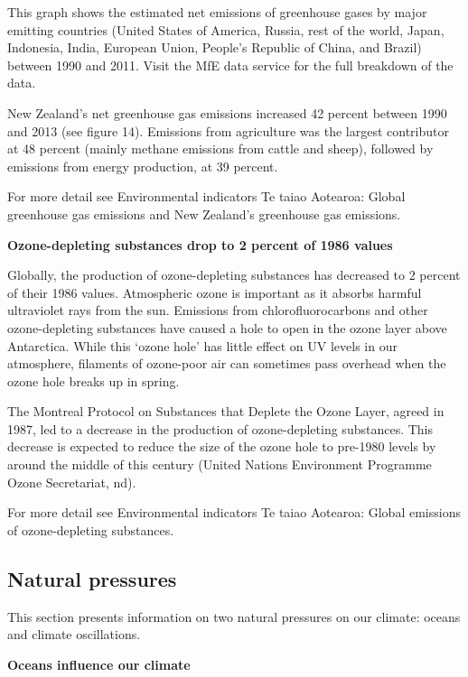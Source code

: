 \documentclass[11pt]{mfe-nzers} %
\begin{document}
This graph shows the estimated net emissions of greenhouse gases by major emitting countries (United States of America, Russia, rest of the world, Japan, Indonesia, India, European Union, People’s Republic of China, and Brazil) between 1990 and 2011. Visit the MfE data service for the full breakdown of the data.

New Zealand’s net greenhouse gas emissions increased 42 percent between 1990 and 2013 (see figure 14). Emissions from agriculture was the largest contributor at 48 percent (mainly methane emissions from cattle and sheep), followed by emissions from energy production, at 39 percent.


For more detail see Environmental indicators Te taiao Aotearoa: Global greenhouse gas emissions and New Zealand’s greenhouse gas emissions.

\textbf{Ozone-depleting substances drop to 2 percent of 1986 values}

Globally, the production of ozone-depleting substances has decreased to 2 percent of their 1986 values. Atmospheric ozone is important as it absorbs harmful ultraviolet rays from the sun. Emissions from chlorofluorocarbons and other ozone-depleting substances have caused a hole to open in the ozone layer above Antarctica. While this ‘ozone hole’ has little effect on UV levels in our atmosphere, filaments of ozone-poor air can sometimes pass overhead when the ozone hole breaks up in spring.

The Montreal Protocol on Substances that Deplete the Ozone Layer, agreed in 1987, led to a decrease in the production of ozone-depleting substances. This decrease is expected to reduce the size of the ozone hole to pre-1980 levels by around the middle of this century (United Nations Environment Programme Ozone Secretariat, nd).

For more detail see Environmental indicators Te taiao Aotearoa: Global emissions of ozone-depleting substances.

\subsection{Natural pressures}
This section presents information on two natural pressures on our climate: oceans and climate oscillations.

\textbf{Oceans influence our climate}
\end{document}
